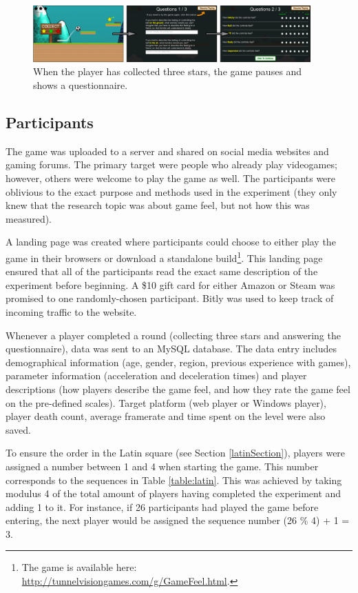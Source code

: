 \begin{figure}[htbp]
\centering
\includegraphics[width=0.95\textwidth]{Pics/game_phases}
\caption{When the player has collected three stars, the game pauses and shows a questionnaire.}
\label{fig:questionnaire}
\end{figure}

\subsection{Participants}
The game was uploaded to a server and shared on social media websites and gaming forums. The primary target were people who already play videogames; however, others were welcome to play the game as well. 
The participants were oblivious to the exact purpose and methods used in the experiment (they only knew that the research topic was about game feel, but not how this was measured).

A landing page was created where participants could choose to either play the game in their browsers or download a standalone build\footnote{The game is available here: \\ \url{http://tunnelvisiongames.com/g/GameFeel.html}.}. This landing page ensured that all of the participants read the exact same description of the experiment before beginning. A \$10 gift card for either Amazon or Steam was promised to one randomly-chosen participant. Bitly \cite{bitly} was used to keep track of incoming traffic to the website.

Whenever a player completed a round (collecting three stars and answering the questionnaire), data was  sent to an MySQL database. The data entry includes demographical information (age, gender, region, previous experience with games), parameter information (acceleration and deceleration times) and player descriptions (how players describe the game feel, and how they rate the game feel on the pre-defined scales). Target platform (web player or Windows player), player death count, average framerate and time spent on the level were also saved.

To ensure the order in the Latin square (see Section \ref{latinSection}), players were assigned a number between 1 and 4 when starting the game. This number corresponds to the sequences in Table \ref{table:latin}. This was achieved by taking modulus 4 of the total amount of players having completed the experiment and adding 1 to it. For instance, if 26 participants had played the game before entering, the next player would be assigned the sequence number (26 \% 4) + 1 = 3.